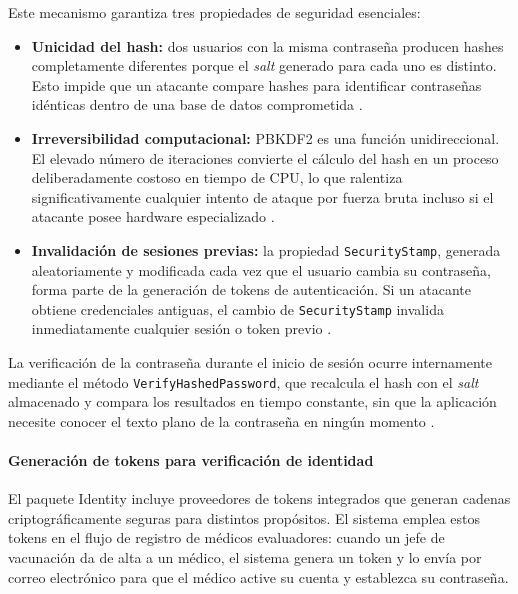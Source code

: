 Este mecanismo garantiza tres propiedades de seguridad esenciales:

\begin{itemize}
    \item \textbf{Unicidad del hash:} dos usuarios con la misma contraseña producen hashes completamente diferentes porque el \textit{salt} generado para cada uno es distinto. Esto impide que un atacante compare hashes para identificar contraseñas idénticas dentro de una base de datos comprometida \cite{owasp_password_storage}.
    
    \item \textbf{Irreversibilidad computacional:} PBKDF2 es una función unidireccional. El elevado número de iteraciones convierte el cálculo del hash en un proceso deliberadamente costoso en tiempo de CPU, lo que ralentiza significativamente cualquier intento de ataque por fuerza bruta incluso si el atacante posee hardware especializado \cite{microsoft_password_hasher}.
    
    \item \textbf{Invalidación de sesiones previas:} la propiedad \texttt{SecurityStamp}, generada aleatoriamente y modificada cada vez que el usuario cambia su contraseña, forma parte de la generación de tokens de autenticación. 
    Si un atacante obtiene credenciales antiguas, el cambio de \texttt{SecurityStamp} invalida inmediatamente cualquier sesión o token previo \cite{microsoft_security_stamp}.
\end{itemize}

La verificación de la contraseña durante el inicio de sesión ocurre internamente mediante el método \texttt{VerifyHashedPassword}, que recalcula el hash con el \textit{salt} almacenado y compara los resultados en tiempo constante, sin que la aplicación necesite conocer el texto plano de la contraseña en ningún momento \cite{microsoft_password_hasher}.


\paragraph{Generación de tokens para verificación de identidad}

El paquete Identity incluye proveedores de tokens integrados que generan cadenas criptográficamente seguras para distintos propósitos. 
El sistema emplea estos tokens en el flujo de registro de médicos evaluadores: cuando un jefe de vacunación da de alta a un médico, el sistema genera un token y lo envía por correo electrónico para que el médico active su cuenta y establezca su contraseña.

